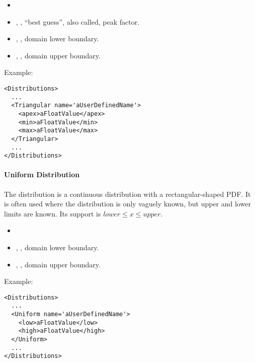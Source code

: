 %
\attrIntro
\vspace{-5mm}
\begin{itemize}
  \itemsep0em
  \item \nameDescription
\end{itemize}
\vspace{-5mm}
\subnodesIntro
\begin{itemize}
  \item {}, , ``best guess'',
  also
  called, peak factor.
  \item {}, , domain lower
  boundary.
  \item {}, , domain upper
  boundary.
\end{itemize}

Example:
\begin{lstlisting}[style=XML]
<Distributions>
  ...
  <Triangular name='aUserDefinedName'>
    <apex>aFloatValue</apex>
    <min>aFloatValue</min>
    <max>aFloatValue</max>
  </Triangular>
  ...
</Distributions>
\end{lstlisting}

\paragraph{Uniform Distribution}
\label{Uniform}
The  distribution is a continuous distribution with a
rectangular-shaped PDF.
%
It is often used where the distribution is only vaguely known, but upper and
lower limits are known.
%
Its support is $lower \le x \le upper$.

%
\attrIntro
\vspace{-5mm}
\begin{itemize}
  \itemsep0em
  \item \nameDescription
\end{itemize}
\vspace{-5mm}
\subnodesIntro
\begin{itemize}
  \item {}, , domain lower
  boundary.
  \item {}, , domain upper
  boundary.
\end{itemize}

Example:
\begin{lstlisting}[style=XML]
<Distributions>
  ...
  <Uniform name='aUserDefinedName'>
    <low>aFloatValue</low>
    <high>aFloatValue</high>
  </Uniform>
  ...
</Distributions>
\end{lstlisting}

